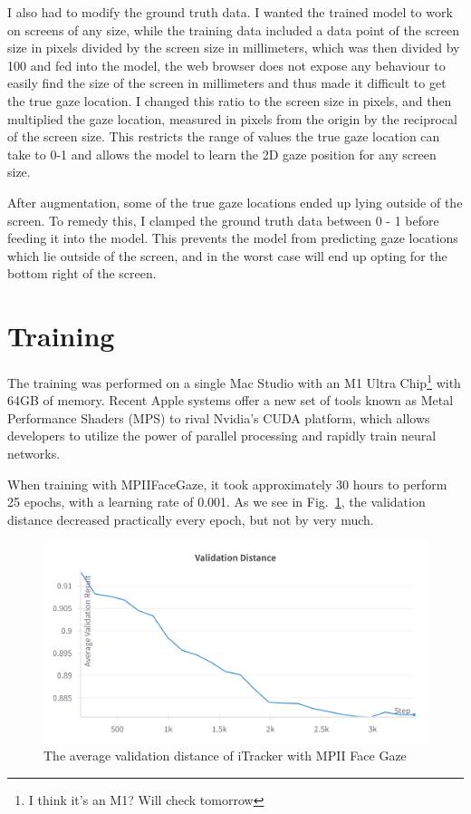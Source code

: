 \documentclass[twocolumn]{report}
\begin{document}
I also had to modify the ground truth data. I wanted the trained model to work on screens of any size, while the training data included a data point of the screen size in pixels divided by the screen size in millimeters, which was then divided by 100 and fed into the model, the web browser does not expose any behaviour to easily find the size of the screen in millimeters and thus made it difficult to get the true gaze location. I changed this ratio to the screen size in pixels, and then multiplied the gaze location, measured in pixels from the origin by the reciprocal of the screen size. This restricts the range of values the true gaze location can take to 0-1 and allows the model to learn the 2D gaze position for any screen size. 

After augmentation, some of the true gaze locations ended up lying outside of the screen. To remedy this, I clamped the ground truth data between 0 - 1 before feeding it into the model. This prevents the model from predicting gaze locations which lie outside of the screen, and in the worst case will end up opting for the bottom right of the screen. 

\section{Training}
\label{sec:training}

The training was performed on a single Mac Studio with an M1 Ultra Chip\footnote{I think it's an M1? Will check tomorrow} with 64GB of memory. Recent Apple systems offer a new set of tools known as Metal Performance Shaders (MPS) to rival Nvidia's CUDA platform, which allows developers to utilize the power of parallel processing and rapidly train neural networks. 

When training with MPIIFaceGaze, it took approximately 30 hours to perform 25 epochs, with a learning rate of 0.001. As we see in Fig.~\ref{fig:val}, the validation distance decreased practically every epoch, but not by very much. 

\begin{figure}
    \begin{center}
        \includegraphics[scale=0.04]{../assets/mpii-val.png}
    \end{center}
    \caption{The average validation distance of iTracker with MPII Face Gaze}
    \label{fig:val}
\end{figure}
\end{document}

